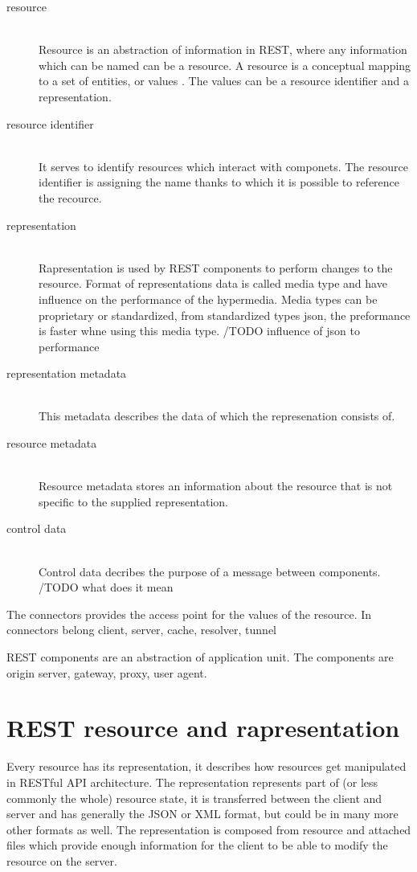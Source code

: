 \begin{description}
  \item [resource] \hfill \\ 
  Resource is an abstraction of information in REST, where any information which can be named can be a resource. A resource is a conceptual mapping to a set of entities, or values \cite{fielding}. The values can be a resource identifier and a representation.
  \item [resource identifier] \hfill \\
  It serves to identify resources which interact with componets. The resource identifier is assigning the name thanks to which it is possible to reference the recource.
  \item [representation] \hfill \\
  Rapresentation is used by REST components to perform changes to the resource. Format of representations data is called media type and have influence on the performance of the hypermedia. Media types can be proprietary or standardized, from standardized types \gls{json}, the preformance is faster whne using this media type. /TODO influence of json to performance
  \item [representation metadata] \hfill \\
  This metadata describes the data of which the represenation consists of.
   \item [resource metadata] \hfill \\
  Resource metadata stores an information about the resource that is not specific to the supplied representation.
  \item [control data] \hfill \\
  Control data decribes the purpose of a message between components. /TODO what does it mean
\end{description}

The connectors provides the access point for the values of the resource. In connectors belong client, server, cache, resolver, tunnel 

REST components are an abstraction of application unit. The components are origin server, gateway, proxy, user agent.


\section{REST resource and rapresentation}
Every resource has its representation, it describes how resources get manipulated in RESTful API architecture. The representation represents part of (or less commonly the whole) resource state, it is transferred between the client and server and has generally the JSON or XML format, but could be in many more other formats as well. The representation is composed from resource and attached files which provide enough information for the client to be able to modify the resource on the server.

